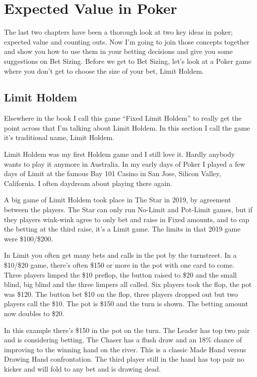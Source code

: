 \chapter{Expected Value in Poker}

The last two chapters have been a thorough look at two key ideas in
poker; expected value and counting outs. Now I'm going to join
those concepts together and show you how to use them in your betting
decisions and give you some suggestions on Bet Sizing. Before we get
to Bet Sizing, let's look at a Poker game where you don't get
to choose the size of your bet, Limit Holdem.

\section{Limit Holdem}

Elsewhere in the book I call this game ``Fixed Limit Holdem'' to
really get the point across that I'm talking about Limit Holdem.
In this section I call the game it's traditional name, Limit
Holdem.

Limit Holdem was my first Holdem game and I still love it. Hardly
anybody wants to play it anymore in Australia. In my early days of
Poker I played a few days of Limit at the famous Bay 101 Casino
in San Jose, Silicon Valley, California. I often daydream about
playing there again.

A big game of Limit Holdem took place in The Star in 2019, by
agreement between the players. The Star can only run No-Limit and
Pot-Limit games, but if they players wink-wink agree to only bet and
raise in Fixed amounts, and to cap the betting at the third raise, it's
a Limit game. The limits in that 2019 game were \$100/\$200.


In Limit you often get many bets and calls in the pot by the
turnstreet. In a \$10/\$20 game, there's often \$150 or more in the
pot with one card to come. Three players limped the
\$10 preflop, the button raised to \$20 and the small blind,
big blind and the three limpers all called. Six players took the flop,
the pot was \$120. The button bet \$10 on the flop, three players
dropped out but two players call the \$10. The pot is \$150 and the turn is
shown. The betting amount now doubles to \$20.

In this example there's \$150 in the pot on the turn. The Leader has
top two pair and is considering betting. The Chaser has a flush draw
and an 18\% chance of improving to the winning hand on the river.
This is a classic Made Hand versus Drawing Hand confrontation.
The third player still in the hand has top pair no kicker and will
fold to any bet and is drawing dead.

